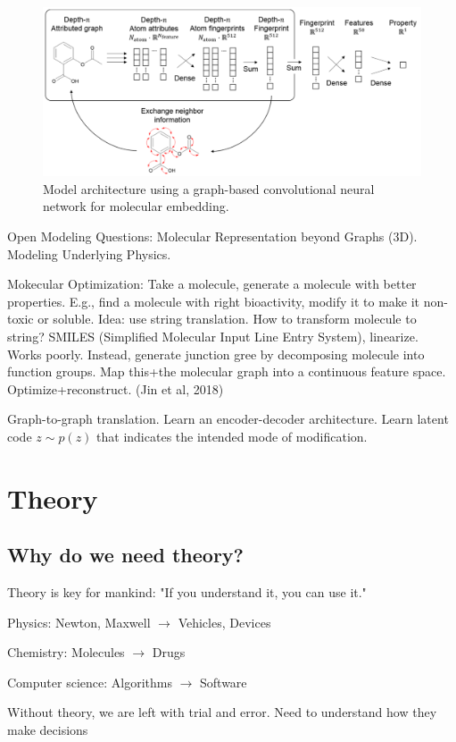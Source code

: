 \documentclass[english]{article}
\begin{document}
\begin{figure}
  \centering
  \includegraphics[width=\textwidth]{gcnn_mol.png}
  \caption{Model architecture using a graph-based convolutional neural network for molecular embedding.}
  \label{gcnn_mol}
\end{figure}

Open Modeling Questions: Molecular Representation beyond Graphs (3D). Modeling Underlying Physics.

Mokecular Optimization: Take a molecule, generate a molecule with better properties. E.g., find a molecule with right bioactivity, modify it to make it non-toxic or soluble. Idea: use string translation. How to transform molecule to string? SMILES (Simplified Molecular Input Line Entry System), linearize. Works poorly. Instead, generate junction gree by decomposing molecule into function groups.  Map this+the molecular graph into a continuous feature space. Optimize+reconstruct. (Jin et al, 2018)

Graph-to-graph translation. Learn an encoder-decoder architecture. Learn latent code $z\sim p(z)$ that indicates the intended mode of modification.


\eenum


\section{Theory}
%
\subsection{Why do we need theory?}
%
\bitem
\item Theory is key for mankind: "If you understand it, you can use it."
\bitem
\item Physics: Newton, Maxwell $\to$ Vehicles, Devices
\item Chemistry: Molecules $\to$ Drugs
\item Computer science: Algorithms $\to$ Software
\eitem
\item Without theory, we are left with trial and error. Need to understand how they make decisions
\end{document}

